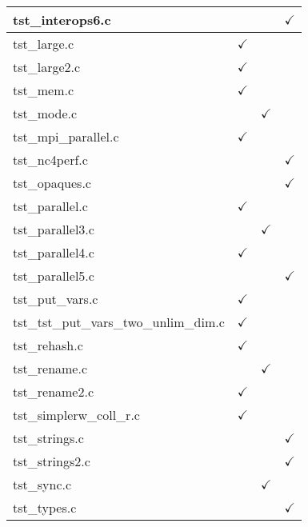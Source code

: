 \begin{table}[H]
\begin{tabular}{|l|c|c|c|}
tst\_interops6.c        &               &               & $\checkmark$  \\ \hline
tst\_large.c            & $\checkmark$  &               &               \\ \hline
tst\_large2.c           & $\checkmark$  &               &               \\ \hline
tst\_mem.c              & $\checkmark$  &               &               \\ \hline
tst\_mode.c             &               & $\checkmark$  &               \\ \hline
tst\_mpi\_parallel.c    & $\checkmark$  &               &               \\ \hline
tst\_nc4perf.c          &               &               & $\checkmark$  \\ \hline
tst\_opaques.c          &               &               & $\checkmark$  \\ \hline
tst\_parallel.c         & $\checkmark$  &               &               \\ \hline
tst\_parallel3.c        &               & $\checkmark$  &               \\ \hline
tst\_parallel4.c        & $\checkmark$  &               &               \\ \hline
tst\_parallel5.c        &               &               & $\checkmark$  \\ \hline
tst\_put\_vars.c        & $\checkmark$  &               &               \\ \hline
tst\_tst\_put\_vars\_two\_unlim\_dim.c & $\checkmark$ & &               \\ \hline
tst\_rehash.c           & $\checkmark$  &               &               \\ \hline
tst\_rename.c           &               & $\checkmark$  &               \\ \hline
tst\_rename2.c          & $\checkmark$  &               &               \\ \hline
tst\_simplerw\_coll\_r.c & $\checkmark$ &               &               \\ \hline
tst\_strings.c          &               &               & $\checkmark$  \\ \hline
tst\_strings2.c         &               &               & $\checkmark$  \\ \hline
tst\_sync.c             &               & $\checkmark$  &               \\ \hline
tst\_types.c            &               &               & $\checkmark$  \\ \hline

\end{tabular}
\end{table}
